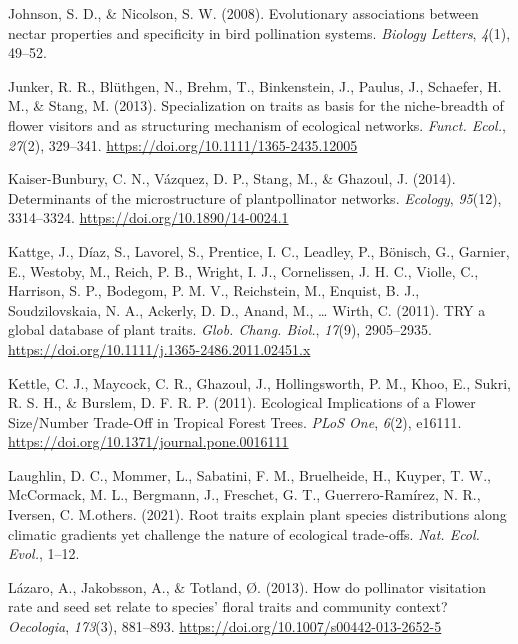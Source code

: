\documentclass[
  12pt,
  a4paper,
]{article}
\newlength{\cslhangindent}
\newlength{\cslentryspacingunit} %
\newenvironment{CSLReferences}[2] %
 {%
  \setlength{\parindent}{0pt}
  \ifodd #1
  \let\oldpar\par
  \def\par{\hangindent=\cslhangindent\oldpar}
  \fi
  \setlength{\parskip}{#2\cslentryspacingunit}
 }%
 {}
\begin{document}
\begin{CSLReferences}{1}{0}
\leavevmode{}%
Johnson, S. D., \& Nicolson, S. W. (2008). Evolutionary associations between nectar properties and specificity in bird pollination systems. \emph{Biology Letters}, \emph{4}(1), 49--52.

\leavevmode{}%
Junker, R. R., Blüthgen, N., Brehm, T., Binkenstein, J., Paulus, J., Schaefer, H. M., \& Stang, M. (2013). Specialization on traits as basis for the niche-breadth of flower visitors and as structuring mechanism of ecological networks. \emph{Funct. Ecol.}, \emph{27}(2), 329--341. \url{https://doi.org/10.1111/1365-2435.12005}

\leavevmode{}%
Kaiser-Bunbury, C. N., Vázquez, D. P., Stang, M., \& Ghazoul, J. (2014). Determinants of the microstructure of plant\textendash pollinator networks. \emph{Ecology}, \emph{95}(12), 3314--3324. \url{https://doi.org/10.1890/14-0024.1}

\leavevmode{}%
Kattge, J., Díaz, S., Lavorel, S., Prentice, I. C., Leadley, P., Bönisch, G., Garnier, E., Westoby, M., Reich, P. B., Wright, I. J., Cornelissen, J. H. C., Violle, C., Harrison, S. P., Bodegom, P. M. V., Reichstein, M., Enquist, B. J., Soudzilovskaia, N. A., Ackerly, D. D., Anand, M., \ldots{} Wirth, C. (2011). {TRY} \textendash{} a global database of plant traits. \emph{Glob. Chang. Biol.}, \emph{17}(9), 2905--2935. \url{https://doi.org/10.1111/j.1365-2486.2011.02451.x}

\leavevmode{}%
Kettle, C. J., Maycock, C. R., Ghazoul, J., Hollingsworth, P. M., Khoo, E., Sukri, R. S. H., \& Burslem, D. F. R. P. (2011). Ecological {Implications} of a {Flower Size}/{Number Trade}-{Off} in {Tropical Forest Trees}. \emph{PLoS One}, \emph{6}(2), e16111. \url{https://doi.org/10.1371/journal.pone.0016111}

\leavevmode{}%
Laughlin, D. C., Mommer, L., Sabatini, F. M., Bruelheide, H., Kuyper, T. W., McCormack, M. L., Bergmann, J., Freschet, G. T., Guerrero-Ramírez, N. R., Iversen, C. M.others. (2021). Root traits explain plant species distributions along climatic gradients yet challenge the nature of ecological trade-offs. \emph{Nat. Ecol. Evol.}, 1--12.

\leavevmode{}%
Lázaro, A., Jakobsson, A., \& Totland, Ø. (2013). How do pollinator visitation rate and seed set relate to species' floral traits and community context? \emph{Oecologia}, \emph{173}(3), 881--893. \url{https://doi.org/10.1007/s00442-013-2652-5}


\end{CSLReferences}
\end{document}
